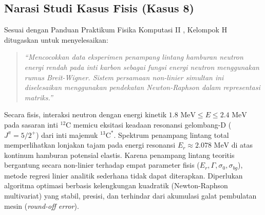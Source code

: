 \subsection*{Narasi Studi Kasus Fisis (Kasus 8)}
Sesuai dengan Panduan Praktikum Fisika Komputasi II \parencite{fiskomunair2026}, Kelompok H ditugaskan untuk menyelesaikan:
\begin{quote}
\textit{``Mencocokkan data eksperimen penampang lintang hamburan neutron energi rendah pada inti karbon sebagai fungsi energi neutron menggunakan rumus Breit-Wigner. Sistem persamaan non-linier simultan ini diselesaikan menggunakan pendekatan Newton-Raphson dalam representasi matriks.''}
\end{quote}

Secara fisis, interaksi neutron dengan energi kinetik $1.8\text{ MeV} \le E \le 2.4\text{ MeV}$ pada sasaran inti $^{12}\text{C}$ memicu eksitasi keadaan resonansi gelombang-D ($J^\pi = 5/2^+$) dari inti majemuk $^{13}\text{C}^*$. Spektrum penampang lintang total memperlihatkan lonjakan tajam pada energi resonansi $E_r \approx 2.078\text{ MeV}$ di atas kontinum hamburan potensial elastis. Karena penampang lintang teoritis bergantung secara non-linier terhadap empat parameter fisis ($E_r, \Gamma, \sigma_0, \sigma_{bg}$), metode regresi linier analitik sederhana tidak dapat diterapkan. Diperlukan algoritma optimasi berbasis kelengkungan kuadratik (Newton-Raphson multivariat) yang stabil, presisi, dan terhindar dari akumulasi galat pembulatan mesin (\textit{round-off error}).
